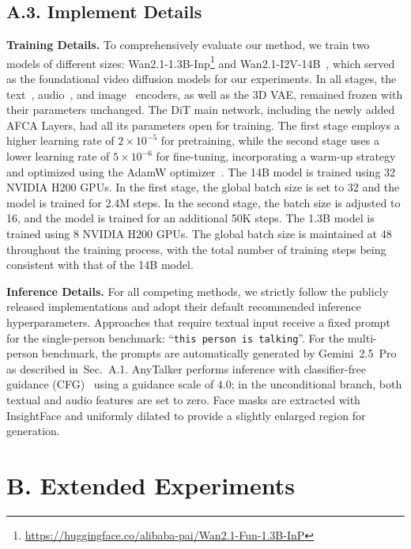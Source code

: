 \subsection*{A.3. Implement Details}
\label{sec:exp-detail}

\noindent \textbf{Training Details.}
To comprehensively evaluate our method, we train two models of different sizes: Wan2.1-1.3B-Inp\footnote{\url{https://huggingface.co/alibaba-pai/Wan2.1-Fun-1.3B-InP}} and Wan2.1-I2V-14B~\cite{wan2025wan}, which served as the foundational video diffusion models for our experiments. 
In all stages, the text~\cite{raffel2020exploring}, audio~\cite{baevski2020wav2vec}, and image~\cite{radford2021learning} encoders, as well as the 3D VAE, remained frozen with their parameters unchanged. 
The DiT main network, including the newly added AFCA Layers, had all its parameters open for training. 
The first stage employs a higher learning rate of \(2 \times 10^{-5}\) for pretraining, while the second stage uses a lower learning rate of \(5 \times 10^{-6}\) for fine-tuning, incorporating a warm-up strategy and optimized using the AdamW optimizer~\cite{loshchilov2017decoupled}. 
The 14B model is trained using 32 NVIDIA H200 GPUs. 
In the first stage, the global batch size is set to 32 and the model is trained for 2.4M steps. 
In the second stage, the batch size is adjusted to 16, and the model is trained for an additional 50K steps.
The 1.3B model is trained using 8 NVIDIA H200 GPUs. 
The global batch size is maintained at 48 throughout the training process, with the total number of training steps being consistent with that of the 14B model.


\noindent \textbf{Inference Details.}
For all competing methods, we strictly follow the publicly released implementations and adopt their default recommended inference hyperparameters.
Approaches that require textual input receive a fixed prompt for the single-person benchmark: ``\texttt{this person is talking}''.
For the multi-person benchmark, the prompts are automatically generated by Gemini~2.5~Pro as described in~Sec.~A.1.
AnyTalker performs inference with classifier-free guidance (CFG)~\citep{ho2021classifier} using a guidance scale of $4.0$; in the unconditional branch, both textual and audio features are set to zero.
Face masks are extracted with InsightFace and uniformly dilated to provide a slightly enlarged region for generation.


\section*{B. Extended Experiments}
\label{sec:exp-res}

